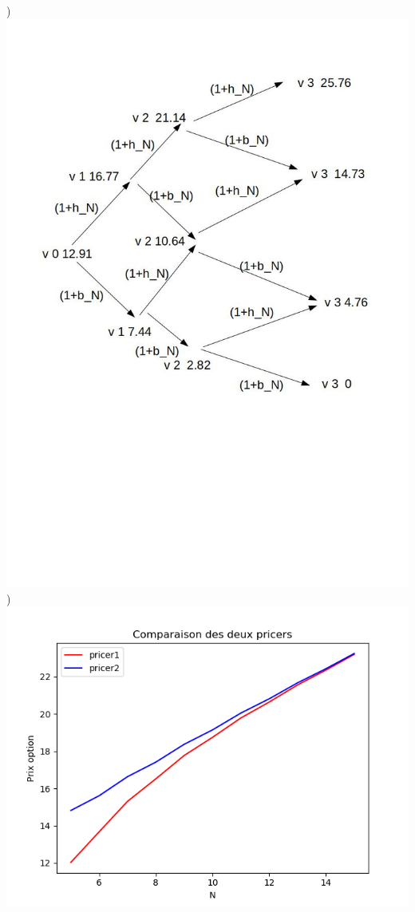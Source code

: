 \documentclass{exam}
\begin{document}
)
\newline
\espace
\includegraphics{question6tree.jpg}
\newline
{})
\newline
\espace
\includegraphics{question7.png}
\end{document}
